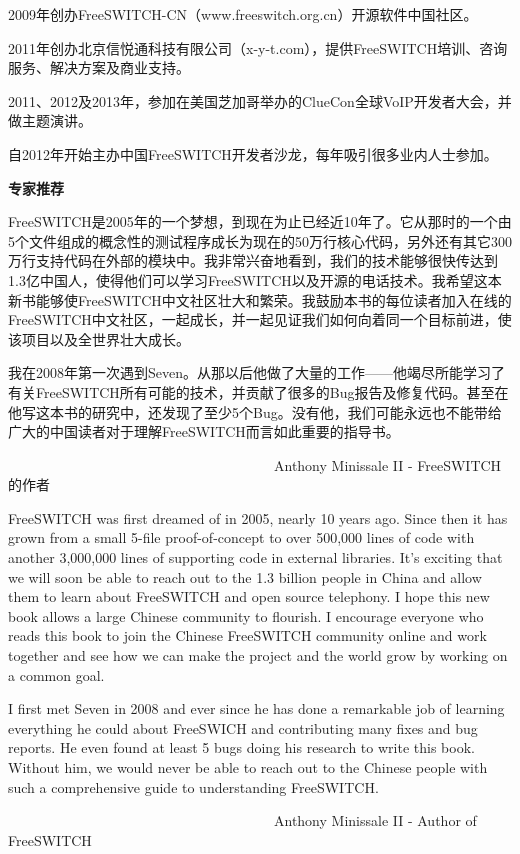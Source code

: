\documentclass[$if(fontsize)$$fontsize$,$endif$$if(lang)$$lang$,$endif$CJKutf8,twoside,openright]{$documentclass$}
\begin{document}
2009年创办FreeSWITCH-CN（www.freeswitch.org.cn）开源软件中国社区。

2011年创办北京信悦通科技有限公司（x-y-t.com），提供FreeSWITCH培训、咨询服务、解决方案及商业支持。

2011、2012及2013年，参加在美国芝加哥举办的ClueCon全球VoIP开发者大会，并做主题演讲。

自2012年开始主办中国FreeSWITCH开发者沙龙，每年吸引很多业内人士参加。

\newpage

{\large \bf 专家推荐}

FreeSWITCH是2005年的一个梦想，到现在为止已经近10年了。它从那时的一个由5个文件组成的概念性的测试程序成长为现在的50万行核心代码，另外还有其它300万行支持代码在外部的模块中。我非常兴奋地看到，我们的技术能够很快传达到1.3亿中国人，使得他们可以学习FreeSWITCH以及开源的电话技术。我希望这本新书能够使FreeSWITCH中文社区壮大和繁荣。我鼓励本书的每位读者加入在线的FreeSWITCH中文社区，一起成长，并一起见证我们如何向着同一个目标前进，使该项目以及全世界壮大成长。

我在2008年第一次遇到Seven。从那以后他做了大量的工作——他竭尽所能学习了有关FreeSWITCH所有可能的技术，并贡献了很多的Bug报告及修复代码。甚至在他写这本书的研究中，还发现了至少5个Bug。没有他，我们可能永远也不能带给广大的中国读者对于理解FreeSWITCH而言如此重要的指导书。

　　　　　　　　　　　　　　　　　　　Anthony Minissale II - FreeSWITCH的作者

FreeSWITCH was first dreamed of in 2005, nearly 10 years ago.  Since then it has grown from a small 5-file proof-of-concept to over 500,000 lines of code with another 3,000,000 lines of supporting code in external libraries.  It’s exciting that we will soon be able to reach out to the 1.3 billion people in China and allow them to learn about FreeSWITCH and open source telephony.   I hope this new book allows a large Chinese community to flourish.  I encourage everyone who reads this book to join the Chinese FreeSWITCH community online and work together and see how we can make the project and the world grow by working on a common goal.

I first met Seven in 2008 and ever since he has done a remarkable job of learning everything he could about FreeSWICH and contributing many fixes and bug reports.  He even found at least 5 bugs doing his research to write this book.  Without him, we would never be able to reach out to the Chinese people with such a comprehensive guide to understanding FreeSWITCH.

　　　　　　　　　　　　　　　　　　　Anthony Minissale II - Author of FreeSWITCH
\end{document}
